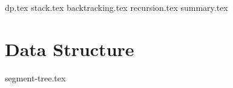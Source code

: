 \documentclass{../latex-setting/cmemoir}
\begin{document}

\frontmatter

\tableofcontents

\restoregeometry%

\mainmatter{}


{dp.tex}
{stack.tex}
{backtracking.tex}
{recursion.tex}
{summary.tex}


\part{Data Structure}
{segment-tree.tex}
\end{document}
